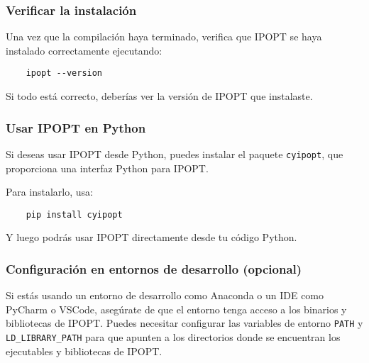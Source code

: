 \subsubsection{Verificar la instalación}

\begin{flushleft}
	Una vez que la compilación haya terminado, verifica que IPOPT se haya instalado correctamente ejecutando:
\end{flushleft}

\begin{verbatim}
	ipopt --version
\end{verbatim}

\begin{flushleft}
	Si todo está correcto, deberías ver la versión de IPOPT que instalaste.
\end{flushleft}

\subsubsection{Usar IPOPT en Python}

\begin{flushleft}
	Si deseas usar IPOPT desde Python, puedes instalar el paquete \texttt{cyipopt}, que proporciona una interfaz Python para IPOPT.
\end{flushleft}

\begin{flushleft}
	Para instalarlo, usa:
\end{flushleft}

\begin{verbatim}
	pip install cyipopt
\end{verbatim}

\begin{flushleft}
	Y luego podrás usar IPOPT directamente desde tu código Python.
\end{flushleft}

\subsubsection{Configuración en entornos de desarrollo (opcional)}

\begin{flushleft}
	Si estás usando un entorno de desarrollo como Anaconda o un IDE como PyCharm o VSCode, asegúrate de que el entorno tenga acceso a los binarios y bibliotecas de IPOPT. Puedes necesitar configurar las variables de entorno \texttt{PATH} y \texttt{LD\_LIBRARY\_PATH} para que apunten a los directorios donde se encuentran los ejecutables y bibliotecas de IPOPT.
\end{flushleft}


